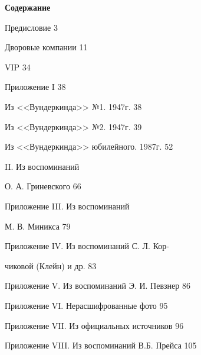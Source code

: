 \documentclass[utf8x, 12pt, twoside, a5paper]{G7-32} %
\begin{document}
\begin{center}

    \textbf{\Large Содержание}

    \indent

    Предисловие \hfill 3
    
    Дворовые компании \hfill 11
    
    VIP \hfill 34
    
    Приложение I \hfill 38
    
    \hspace{20pt} Из <<Вундеркинда>> №1. 1947г. \hfill 38
    
    \hspace{20pt} Из <<Вундеркинда>> №2. 1947г. \hfill 39
    
    \hspace{20pt} Из <<Вундеркинда>> юбилейного. 1987г. \hfill 52
    
    
    { II. Из воспоминаний 
    
    }
    
    \hspace{93pt}О. А. Гриневского \hfill 66
    
    {\raggedright Приложение III. Из воспоминаний
    
    } 
    \hspace{93pt}М. В. Миникса \hfill 79
   
    {\raggedright Приложение IV. Из воспоминаний С. Л. Кор-
    
    }
    
    \hspace{93pt}чиковой (Клейн) и др. \hfill 83
    
    Приложение V. Из воспоминаний Э. И. Певзнер \hfill 86
    
    Приложение VI. Нерасшифрованные фото \hfill 95    
    
    Приложение VII. Из официальных источников \hfill 96
    
    Приложение VIII. Из воспоминаний В.Б. Прейса \hfill 105
    
\end{center}
\end{document}
